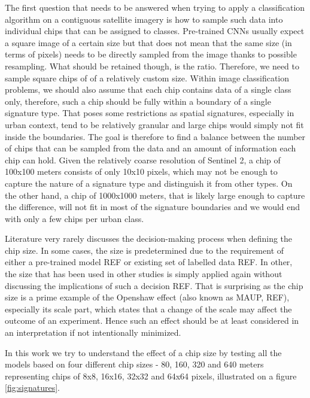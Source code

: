 The first question that needs to be answered when trying to apply a classification
algorithm on a contiguous satellite imagery is how to sample such data into individual
chips that can be assigned to classes. Pre-trained CNNs usually expect a square image of
a certain size but that does not mean that the same size (in terms of pixels) needs to
be directly sampled from the image thanks to possible resampling. What should be
retained though, is the ratio. Therefore, we need to sample square chips of of a
relatively custom size. Within image classification problems, we should also assume that
each chip contains data of a single class only, therefore, such a chip should be fully
within a boundary of a single signature type. That poses some restrictions as spatial
signatures, especially in urban context, tend to be relatively granular and large chips
would simply not fit inside the boundaries. The goal is therefore to find a balance
between the number of chips that can be sampled from the data and an amount of
information each chip can hold. Given the relatively coarse resolution of Sentinel 2, a
chip of 100x100 meters consists of only 10x10 pixels, which may not be enough to capture
the nature of a signature type and distinguish it from other types. On the other hand, a
chip of 1000x1000 meters, that is likely large enough to capture the difference, will
not fit in most of the signature boundaries and we would end with only a few chips per
urban class.

Literature very rarely discusses the decision-making process when defining the chip
size. In some cases, the size is predetermined due to the requirement of either a
pre-trained model REF or existing set of labelled data REF. In other, the size that has
been used in other studies is simply applied again without discussing the implications
of such a decision REF. That is surprising as the chip size is a prime example of the
Openshaw effect (also known as MAUP, REF), especially its scale part, which states that
a change of the scale may affect the outcome of an experiment. Hence such an effect
should be at least considered in an interpretation if not intentionally minimized.

In this work we try to understand the effect of a chip size by testing all the models
based on four different chip sizes - 80, 160, 320 and 640 meters representing chips of
8x8, 16x16, 32x32 and 64x64 pixels, illustrated on a figure \ref{fig:signatures}.


